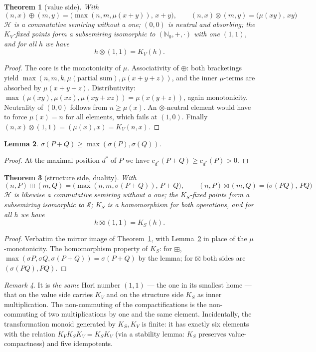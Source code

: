 \documentclass[11pt]{article}
\newtheorem{satz}{Theorem}[section]
\newtheorem{lemma}[satz]{Lemma}
\theoremstyle{definition}
\theoremstyle{remark}
\newtheorem{bemerkung}[satz]{Remark}
\newcommand{\Hori}{\mathcal H}
\newcommand{\Struk}{\mathcal S}
\newcommand{\NN}{\mathbb N_0}
\newcommand{\KV}{K_V}
\newcommand{\KS}{K_S}
\begin{document}
\begin{satz}[value side]\label{satz:wertseite}
With
\[
(n,x)\oplus(m,y)=\bigl(\max(n,m,\mu(x{+}y)),\,x{+}y\bigr),
\qquad
(n,x)\otimes(m,y)=\bigl(\mu(xy),\,xy\bigr)
\]
$\Hori$ is a commutative semiring without a one; $(0,0)$ is neutral
and absorbing; the $\KV$-fixed points form a subsemiring isomorphic
to $(\NN,+,\cdot)$ with one $(1,1)$, and for all $h$ we have
\[
h\otimes(1,1)=\KV(h).
\]
\end{satz}

\begin{proof}
The core is the monotonicity of $\mu$. Associativity of $\oplus$:
both bracketings yield
$\max(n,m,k,\mu(\text{partial sum}),\mu(x{+}y{+}z))$, and the inner
$\mu$-terms are absorbed by $\mu(x{+}y{+}z)$. Distributivity:
$\max(\mu(xy),\mu(xz),\mu(xy{+}xz))=\mu(x(y{+}z))$, again
monotonicity. Neutrality of $(0,0)$ follows from $n\ge\mu(x)$. An
$\otimes$-neutral element would have to force $\mu(x)=n$ for all
elements, which fails at $(1,0)$. Finally
$(n,x)\otimes(1,1)=(\mu(x),x)=\KV(n,x)$.
\end{proof}

\begin{lemma}\label{lem:sigmamono}
$\sigma(P+Q)\ge\max(\sigma(P),\sigma(Q))$.
\end{lemma}

\begin{proof}
At the maximal position $d^*$ of $P$ we have
$c_{d^*}(P{+}Q)\ge c_{d^*}(P)>0$.
\end{proof}

\begin{satz}[structure side, duality]\label{satz:dualitaet}
With
\[
(n,P)\boxplus(m,Q)=\bigl(\max(n,m,\sigma(P{+}Q)),\,P{+}Q\bigr),
\qquad
(n,P)\boxtimes(m,Q)=\bigl(\sigma(PQ),\,PQ\bigr)
\]
$\Hori$ is likewise a commutative semiring without a one; the
$\KS$-fixed points form a subsemiring isomorphic to $\Struk$;
$\KS$ is a homomorphism for both operations, and for all $h$ we
have
\[
h\boxtimes(1,1)=\KS(h).
\]
\end{satz}

\begin{proof}
Verbatim the mirror image of Theorem~\ref{satz:wertseite}, with
Lemma~\ref{lem:sigmamono} in place of the $\mu$-monotonicity. The
homomorphism property of $\KS$: for $\boxplus$,
$\max(\sigma P,\sigma Q,\sigma(P{+}Q))=\sigma(P{+}Q)$ by the
lemma; for $\boxtimes$ both sides are
$(\sigma(PQ),PQ)$.
\end{proof}

\begin{bemerkung}
It is \emph{the same} Hori number $(1,1)$ --- the one in its
smallest home --- that on the value side carries $\KV$ and on the
structure side $\KS$ as inner multiplication. The non-commuting of
the compactifications is the non-commuting of two multiplications
by one and the same element. Incidentally, the transformation
monoid generated by $\KS,\KV$ is finite: it has exactly six
elements with the relation
$\KV\KS\KV=\KS\KV$ (via a stability lemma: $\KS$ preserves
value-compactness) and five idempotents.
\end{bemerkung}
\end{document}
